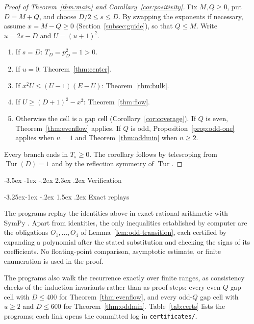 \documentclass[twoside,10pt]{article}
\makeatletter
\numberwithin{equation}{section}
\theoremstyle{slbody}
\theoremstyle{definition}
\theoremstyle{remark}
\numberwithin{theorem}{section}
\DeclareMathOperator{\Tur}{Tur}
\renewcommand{\section}{%
  \@startsection{section}{1}{\z@}%
    {-3.5ex \@plus -1ex \@minus -.2ex}%
    {2.3ex \@plus .2ex}%
    {\normalfont\large\bfseries}}
\renewcommand{\subsection}{%
  \@startsection{subsection}{2}{\z@}%
    {-3.25ex\@plus -1ex \@minus -.2ex}%
    {1.5ex \@plus .2ex}%
    {\normalfont\normalsize\bfseries}}
\makeatother
\begin{document}
\begin{proof}[Proof of Theorem~\textup{\ref{thm:main}} and
Corollary~\textup{\ref{cor:positivity}}]
Fix $M,Q\ge0$, put $D=M+Q$, and choose $D/2\le s\le D$.  By swapping the
exponents if necessary, assume $x=M-Q\ge0$
(Section~\ref{subsec:guide}), so that $Q\le M$.  Write $u=2s-D$ and
$U=(u+1)^2$.
\begin{enumerate}
\item If $s=D$: $T_D=p_D^2=1>0$.
\item If $u=0$: Theorem~\ref{thm:center}.
\item If $x^2U\le(U-1)(E-U)$: Theorem~\ref{thm:bulk}.
\item If $U\ge(D+1)^2-x^2$: Theorem~\ref{thm:flow}.
\item Otherwise the cell is a gap cell (Corollary~\ref{cor:coverage}).  If
  $Q$ is even, Theorem~\ref{thm:evenflow} applies.  If $Q$ is odd,
  Proposition~\ref{prop:odd-one} applies when $u=1$ and
  Theorem~\ref{thm:oddmin} when $u\ge2$.
\end{enumerate}
Every branch ends in $T_s\ge 0$.  The corollary follows by telescoping
from $\Tur(D)=1$ and by the reflection symmetry of $\Tur$.
\end{proof}

\section{Verification}\label{sec:machine}

\subsection{Exact replays}

The programs replay the identities above in exact rational arithmetic with
SymPy \cite{meurer2017sympy}.  Apart from identities, the only inequalities
established by computer are the obligations $O_1,\dots,O_4$ of
Lemma~\ref{lem:odd-transition}, each certified by expanding a polynomial
after the stated substitution and checking the signs of its coefficients.
No floating-point comparison, asymptotic estimate, or finite enumeration is
used in the proof.

The programs also walk the recurrence exactly over finite ranges, as
consistency checks of the induction invariants rather than as proof
steps: every even-$Q$ gap cell with $D\le400$ for
Theorem~\ref{thm:evenflow}, and every odd-$Q$ gap cell with $u\ge2$ and
$D\le600$ for Theorem~\ref{thm:oddmin}.  Table~\ref{tab:certs} lists the
programs; each link opens the committed log in \texttt{certificates/}.
\end{document}
